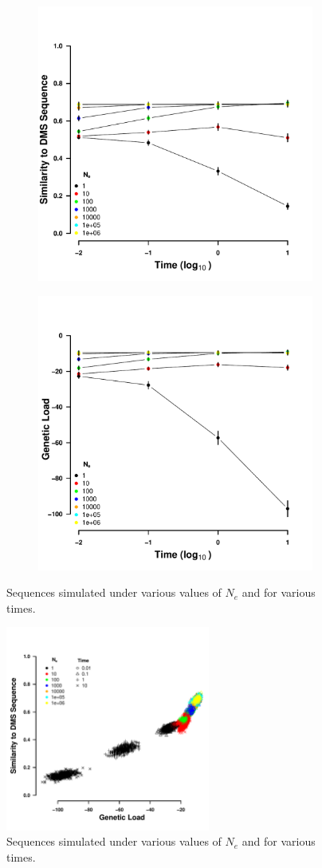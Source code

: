 \documentclass[12pt]{article}
\begin{document}
\begin{figure}[h]
    \centering
    \begin{subfigure}
        \centering
        \includegraphics[width=.45\textwidth]{img/simulated_dist_time.pdf}
    \end{subfigure}
    \begin{subfigure}
        \centering
        \includegraphics[width=.45\textwidth]{img/simulated_gl_time.pdf}
    \end{subfigure}
    \caption{Sequences simulated under various values of $N_e$ and for various times.}
    \label{fig:dms_sim}
\end{figure}

\begin{figure}[H]
     \centering
	\includegraphics[width=0.6\textwidth]{img/simulated_seqs_gl_dist.pdf}
	\caption{Sequences simulated under various values of $N_e$ and for various times.}
	\label{fig:sim_seqs}
\end{figure}
\end{document}
